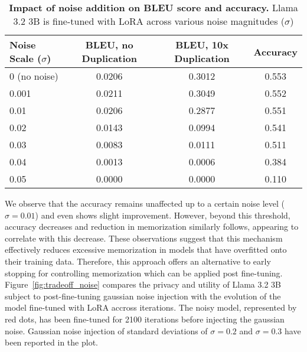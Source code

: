 \begin{table}[!htbp]
\caption{\textbf{Impact of noise addition on BLEU score and accuracy.} Llama 3.2 3B is fine-tuned with LoRA across various noise magnitudes ($\sigma$)}
\label{tab:noise_addition}
\vskip 0.15in
\begin{center}
\begin{scriptsize}
\begin{tabular}{@{}l|ccc@{}}
\toprule
Noise Scale ($\sigma$)   & BLEU, no Duplication & BLEU, 10x Duplication & Accuracy       \\ \midrule
0 (no noise)             & 0.0206         & 0.3012          & 0.553          \\
0.001                    & 0.0211         & 0.3049          & 0.552          \\
0.01                     & 0.0206         & 0.2877          & 0.551          \\
0.02                     & 0.0143         & 0.0994          & 0.541          \\
0.03                     & 0.0083         & 0.0111          & 0.511          \\
0.04                     & 0.0013         & 0.0006          & 0.384          \\ 
0.05                     & 0.0000         & 0.0000          & 0.110          \\
\bottomrule
\end{tabular}
\end{scriptsize}
\end{center}
\vskip -0.1in
\end{table}

We observe that the accuracy remains unaffected up to a certain noise level ($\sigma = 0.01$) and even shows slight improvement. However, beyond this threshold, accuracy decreases and reduction in memorization similarly follows, appearing to correlate with this decrease. These observations suggest that this mechanism effectively reduces excessive memorization in models that have overfitted onto their training data. Therefore, this approach offers an alternative to early stopping for controlling memorization which can be applied post fine-tuning. Figure~\ref{fig:tradeoff_noise} compares the privacy and utility of Llama 3.2 3B subject to post-fine-tuning gaussian noise injection with the evolution of the model fine-tuned with LoRA accross iterations. The noisy model, represented by red dots, has been fine-tuned for 2100 iterations before injecting the gaussian noise. Gaussian noise injection of standard deviations of $\sigma=0.2$ and $\sigma=0.3$ have been reported in the plot.

